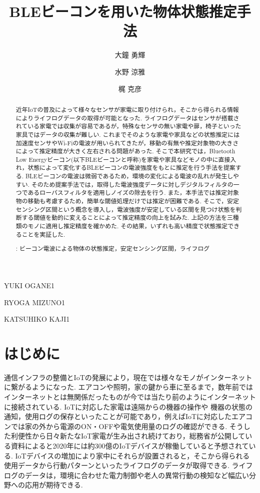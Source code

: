 \documentclass[Japanese]{dicomopapers}
\begin{document}
\title{BLEビーコンを用いた物体状態推定手法}


\author{大鐘 勇輝}{YUKI OGANE}{1}
\author{水野 涼雅}{RYOGA MIZUNO}{1}
\author{梶 克彦}{KATSUHIKO KAJI}{1}




\begin{abstract}
近年IoTの普及によって様々なセンサが家電に取り付けられ，そこから得られる情報によりライフログデータの取得が可能となった.
ライフログデータはセンサが搭載されている家電では収集が容易であるが，特殊なセンサの無い家電や扉，椅子といった家具ではデータの収集が難しい.
これまでそのような家電や家具などの状態推定には加速度センサやWi-Fiの電波が用いられてきたが，移動の有無や推定対象物の大きさによって推定精度が大きく左右される問題があった.
そこで本研究では，Bluetooth Low Energyビーコン(以下BLEビーコンと呼称)を家電や家具などモノの中に直接入れ，状態によって変化するBLEビーコンの電波強度をもとに推定を行う手法を提案する.
BLEビーコンの電波は微弱であるため，環境の変化による電波の乱れが発生しやすい.
そのため提案手法では，取得した電波強度データに対しデジタルフィルタの一つであるローパスフィルタを適用しノイズの除去を行う.
また，本手法では推定対象物の移動も考慮するため，簡単な閾値処理だけでは推定が困難である.
そこで，安定センシング区間という概念を導入し，電波強度が安定している区間を見つけ状態を判断する閾値を動的に変えることによって推定精度の向上を試みた.
上記の方法を三種類のモノに適用し推定精度を確かめた.
その結果，いずれも高い精度で状態推定できることを実証した.

 : ビーコン電波による物体の状態推定，安定センシング区間，ライフログ



\end{abstract}

\maketitle

\section{はじめに}
通信インフラの整備とIoTの発展により，現在では様々なモノがインターネットに繋がるようになった.
エアコンや照明，家の鍵から車に至るまで，数年前ではインターネットとは無関係だったものが今では当たり前のようにインターネットに接続されている.
IoTに対応した家電は遠隔からの機器の操作や 機器の状態の通知，使用ログの保存といったことが可能であり，例えばIoTに対応したエアコンでは家の外から電源のON・OFFや電気使用量のログの確認ができる.
そうした利便性から日々新たなIoT家電が生み出され続けており，総務省が公開している資料\cite{soumusyo}によると2020年には約300億のIoTデバイスが稼働していると予想されている.
IoTデバイスの増加により家中にそれらが設置されると，そこから得られる使用データから行動パターンといったライフログのデータが取得できる.
ライフログのデータは，環境に合わせた電力制御や老人の異常行動の検知など幅広い分野への応用が期待できる.
\end{document}
